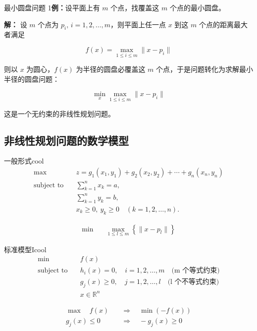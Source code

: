 \begin{exbox}{最小圆盘问题}
    1\textbf{例：}设平面上有 $m$ 个点，找覆盖这 $m$ 个点的最小圆盘。

    \textbf{解：} 设 $m$ 个点为 $p_i, \, i = 1, 2, \dots, m$，则平面上任一点 $x$ 到这 $m$ 个点的距离最大者满足
    
    \[
    f(x) = \max_{1 \leq i \leq m} \| x - p_i \|
    \]
    
    则以 $x$ 为圆心，$f(x)$ 为半径的圆盘必覆盖这 $m$ 个点，于是问题转化为求解最小半径的圆盘问题：
    
    \[
    \min_x \max_{1 \leq i \leq m} \| x - p_i \|
    \]
    
    这是一个无约束的非线性规划问题。
\end{exbox}

\subsection{非线性规划问题的数学模型}
\begin{thmbox}{一般形式}{cool}
    \begin{align*}
        \text{max} \quad & z = g_1(x_1, y_1) + g_2(x_2, y_2) + \cdots + g_n(x_n, y_n) \\
        \text{subject to} \quad & \sum_{k=1}^{n} x_k = a, \\
        & \sum_{k=1}^{n} y_k = b, \\
        & x_k \geq 0, \ y_k \geq 0 \quad (k = 1, 2, \dots, n).
        \end{align*}
        
        \begin{align*}
        \text{min} \quad & \max_{1 \leq l \leq m} \left\{ \| x - p_l \| \right\}
    \end{align*}
\end{thmbox}
\begin{thmbox}{标准模型I}{cool}
    \begin{align*}
        \min \quad & f(x) \\
        \text{subject to} \quad & h_i(x) = 0, \quad i = 1, 2, \dots, m \quad \text{(m 个等式约束)} \\
        & g_j(x) \geq 0, \quad j = 1, 2, \dots, l \quad \text{(l 个不等式约束)} \\
        & x \in \mathbb{R}^n
        \end{align*}
        
        \bigskip
        \begin{align*}
        \max \quad  f(x) \quad &\Rightarrow \quad \min (-f(x)) \\
        g_j(x) \leq 0  \quad &\Rightarrow \quad -g_j(x) \geq 0
        \end{align*}
\end{thmbox}




